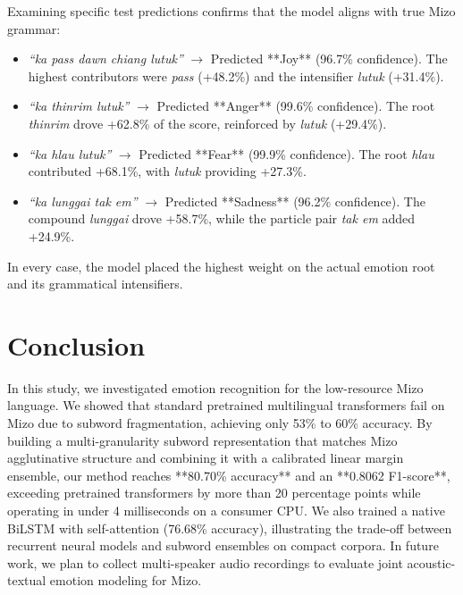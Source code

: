 \documentclass[conference]{IEEEtran}
\begin{document}
Examining specific test predictions confirms that the model aligns with true Mizo grammar:
\begin{itemize}
    \item \textit{``ka pass dawn chiang lutuk''} $\to$ Predicted **Joy** (96.7\% confidence). The highest contributors were \textit{pass} (+48.2\%) and the intensifier \textit{lutuk} (+31.4\%).
    \item \textit{``ka thinrim lutuk''} $\to$ Predicted **Anger** (99.6\% confidence). The root \textit{thinrim} drove +62.8\% of the score, reinforced by \textit{lutuk} (+29.4\%).
    \item \textit{``ka hlau lutuk''} $\to$ Predicted **Fear** (99.9\% confidence). The root \textit{hlau} contributed +68.1\%, with \textit{lutuk} providing +27.3\%.
    \item \textit{``ka lunggai tak em''} $\to$ Predicted **Sadness** (96.2\% confidence). The compound \textit{lunggai} drove +58.7\%, while the particle pair \textit{tak em} added +24.9\%.
\end{itemize}
In every case, the model placed the highest weight on the actual emotion root and its grammatical intensifiers.

\section{Conclusion}
In this study, we investigated emotion recognition for the low-resource Mizo language. We showed that standard pretrained multilingual transformers fail on Mizo due to subword fragmentation, achieving only 53\% to 60\% accuracy. By building a multi-granularity subword representation that matches Mizo agglutinative structure and combining it with a calibrated linear margin ensemble, our method reaches **80.70\% accuracy** and an **0.8062 F1-score**, exceeding pretrained transformers by more than 20 percentage points while operating in under 4 milliseconds on a consumer CPU. We also trained a native BiLSTM with self-attention (76.68\% accuracy), illustrating the trade-off between recurrent neural models and subword ensembles on compact corpora. In future work, we plan to collect multi-speaker audio recordings to evaluate joint acoustic-textual emotion modeling for Mizo.
\end{document}
